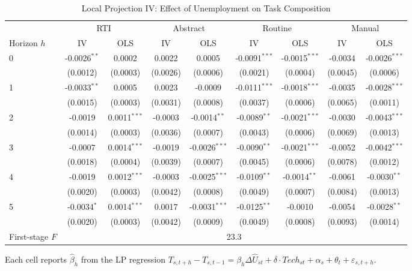 \begin{table}[htbp]
\centering
\caption{Local Projection IV: Effect of Unemployment on Task Composition}
\label{tab:lpiv}
\small
\begin{tabular}{lcccccccc}
\hline\hline
& \multicolumn{2}{c}{RTI} & \multicolumn{2}{c}{Abstract} & \multicolumn{2}{c}{Routine} & \multicolumn{2}{c}{Manual} \\
\cmidrule(lr){2-3}\cmidrule(lr){4-5}\cmidrule(lr){6-7}\cmidrule(lr){8-9}
Horizon $h$ & IV & OLS & IV & OLS & IV & OLS & IV & OLS \\
\hline
0 & -0.0026$^{**}$ & 0.0002 & 0.0022 & 0.0005 & -0.0091$^{***}$ & -0.0015$^{***}$ & -0.0034 & -0.0026$^{***}$ \\
 & (0.0012) & (0.0003) & (0.0026) & (0.0006) & (0.0021) & (0.0004) & (0.0045) & (0.0006) \\[3pt]
1 & -0.0033$^{**}$ & 0.0005 & 0.0023 & -0.0009 & -0.0111$^{***}$ & -0.0018$^{***}$ & -0.0035 & -0.0028$^{***}$ \\
 & (0.0015) & (0.0003) & (0.0031) & (0.0008) & (0.0037) & (0.0006) & (0.0065) & (0.0011) \\[3pt]
2 & -0.0019 & 0.0011$^{***}$ & -0.0003 & -0.0014$^{**}$ & -0.0089$^{**}$ & -0.0021$^{***}$ & -0.0030 & -0.0043$^{***}$ \\
 & (0.0014) & (0.0003) & (0.0036) & (0.0007) & (0.0043) & (0.0006) & (0.0069) & (0.0013) \\[3pt]
3 & -0.0007 & 0.0014$^{***}$ & -0.0019 & -0.0026$^{***}$ & -0.0090$^{**}$ & -0.0021$^{***}$ & -0.0052 & -0.0042$^{***}$ \\
 & (0.0018) & (0.0004) & (0.0039) & (0.0007) & (0.0045) & (0.0006) & (0.0078) & (0.0012) \\[3pt]
4 & -0.0019 & 0.0012$^{***}$ & -0.0003 & -0.0025$^{***}$ & -0.0109$^{**}$ & -0.0014$^{**}$ & -0.0061 & -0.0030$^{**}$ \\
 & (0.0020) & (0.0003) & (0.0042) & (0.0008) & (0.0049) & (0.0007) & (0.0084) & (0.0013) \\[3pt]
5 & -0.0034$^{*}$ & 0.0014$^{***}$ & 0.0017 & -0.0031$^{***}$ & -0.0125$^{**}$ & -0.0010 & -0.0054 & -0.0028$^{**}$ \\
 & (0.0020) & (0.0003) & (0.0042) & (0.0009) & (0.0049) & (0.0008) & (0.0093) & (0.0014) \\[3pt]
\hline
First-stage $F$ & \multicolumn{8}{c}{23.3} \\
\hline\hline
\end{tabular}
\begin{tablenotes}\small
\item Each cell reports $\hat{\beta}_h$ from the LP regression $T_{s,t+h} - T_{s,t-1} = \beta_h \Delta \hat{U}_{st} + \delta \cdot Tech_{st} + \alpha_s + \theta_t + \varepsilon_{s,t+h}$.

\end{tablenotes}
\end{table}
